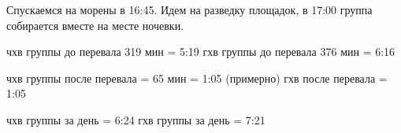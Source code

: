 Спускаемся на морены в 16:45. Идем на разведку площадок, в 17:00 группа собирается вместе на месте ночевки.












чхв группы до перевала 319 мин = 5:19
гхв группы до перевала 376 мин = 6:16

чхв группы после перевала = 65 мин = 1:05 (примерно)
гхв после перевала = 1:05

чхв группы за день = 6:24
гхв группы за день = 7:21

    \FloatBarrier
